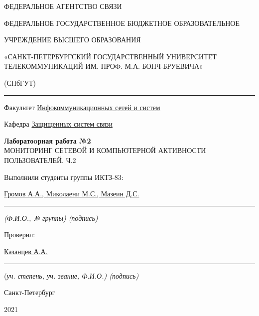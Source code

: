 \documentclass[a4paper,14pt]{extarticle}
\begin{document}
    \begin{center}
        \thispagestyle{empty}
        \begin{singlespace}
        ФЕДЕРАЛЬНОЕ АГЕНТСТВО СВЯЗИ

        ФЕДЕРАЛЬНОЕ ГОСУДАРСТВЕННОЕ БЮДЖЕТНОЕ ОБРАЗОВАТЕЛЬНОЕ

        УЧРЕЖДЕНИЕ ВЫСШЕГО ОБРАЗОВАНИЯ

        «САНКТ-ПЕТЕРБУРГСКИЙ ГОСУДАРСТВЕННЫЙ УНИВЕРСИТЕТ ТЕЛЕКОММУНИКАЦИЙ ИМ. ПРОФ. М.А. БОНЧ-БРУЕВИЧА»

        (СПбГУТ)
        \end{singlespace}
        \vspace{-1ex}
        \rule{\textwidth}{0.4pt}
        \vspace{-5ex}

        Факультет \underline{Инфокоммуникационных сетей и систем}

        Кафедра \underline{Защищенных систем связи}
        \vspace{10ex}

        \textbf{Лаборатоoрная работа №2}\\
        МОНИТОРИНГ СЕТЕВОЙ И КОМПЬЮТЕРНОЙ АКТИВНОСТИ ПОЛЬЗОВАТЕЛЕЙ. Ч.2
        


    \end{center}
    \vspace{4ex}
    \begin{flushright}
    \parbox{10 cm}{
    \begin{flushleft}
        Выполнили студенты группы ИКТЗ-83:

        \underline{Громов А.А., Миколаени М.С., Мазеин Д.С.} \hfill \rule[-0.85ex]{0.1\textwidth}{0.6pt}

        \footnotesize \textit{ (Ф.И.О., № группы) \hfill (подпись)} \normalsize

        Проверил:

        \underline{Казанцев А.А.} \hfill \rule[-0.85ex]{0.1\textwidth}{0.6pt}

        (\footnotesize \textit{уч. степень, уч. звание, Ф.И.О.) \hfill (подпись)} \normalsize

    \end{flushleft}
    }
    \end{flushright}
    \begin{center}
        \vfill
        Санкт-Петербург

        2021

    \end{center}
    \newpage
\end{document}
